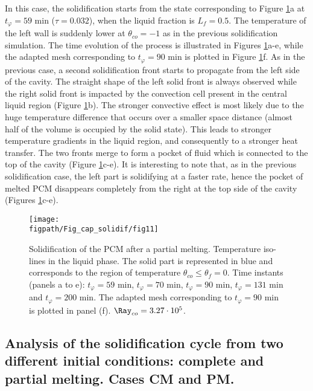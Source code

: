 In this case, the solidification starts from the state corresponding to Figure \ref{fig:evolution_t80}a at $t_{\varphi} = 59$ min ($\tau=0.032$), when the liquid fraction is $L_f = 0.5$. 
The temperature of the left wall is suddenly lower at $\theta_{co}=-1$ as in the previous solidification simulation.  
The time evolution of the process is illustrated in Figures \ref{fig:evolution_t80}a-e, while the adapted mesh corresponding to $t_{\varphi} = 90$ min is plotted in Figure \ref{fig:evolution_t80}f. 
As in the previous case, a second  solidification front starts to propagate from the left side of the cavity. 
The straight shape of the left solid front is always observed while the right solid front is impacted by the convection cell present in the central liquid region (Figure \ref{fig:evolution_t80}b). 
The stronger convective effect is most likely due to the huge temperature difference that occurs over a smaller space distance (almost half of the volume is occupied by the solid state). 
This leads to stronger temperature gradients in the liquid region, and consequently to a stronger heat transfer.   
The two fronts merge to form a pocket of fluid which is connected to the top of the cavity (Figure \ref{fig:evolution_t80}c-e). 
It is interesting to  note that, as in the previous solidification case, the left part is solidifying at a faster rate, hence the pocket of melted PCM disappears completely from the right at the top side of the cavity (Figures \ref{fig:evolution_t80}c-e).
\begin{figure}
	\begin{center}
		\texttt{[image: \\figpath/Fig\_cap\_solidif/fig11]}
	\end{center}
	\caption{Solidification of the PCM after a partial melting. Temperature iso-lines in the liquid phase. The solid part is represented in blue and corresponds to the region of temperature $\theta_{co} \leq \theta_f=0$. Time instants (panels  a to e): $t_{\varphi} = 59$ min, $t_{\varphi} = 70$ min, $t_{\varphi} = 90$ min, $t_{\varphi} = 131$ min and $t_{\varphi} = 200$ min. The adapted mesh corresponding to $t_{\varphi} = 90$ min is plotted in panel (f).  $ \Ray_{co}=3.27 \cdot 10^5$.}\label{fig:evolution_t80}
\end{figure}

\subsection{Analysis of the solidification cycle from two different initial conditions: complete and partial melting. Cases CM and PM. } \label{sec_freezing_full} 


